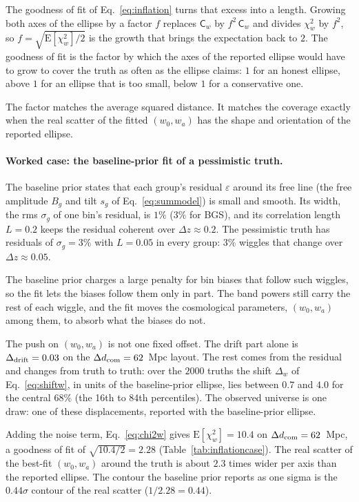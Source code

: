 \documentclass[11pt]{article}
\newcommand{\Cov}{\mathsf{C}}
\begin{document}
The goodness of fit of Eq.~\eqref{eq:inflation} turns that excess
into a length.  Growing both axes of the ellipse by a factor $f$
replaces $\Cov_w$ by $f^2\,\Cov_w$ and divides $\chi^2_w$ by $f^2$, so
$f = \sqrt{\mathrm{E}[\chi^2_w]/2}$ is the growth that brings the
expectation back to $2$.  The goodness of fit is the factor by which
the axes of the reported ellipse would have to grow to cover the truth as
often as the ellipse claims: $1$ for an honest ellipse, above $1$ for
an ellipse that is too small, below $1$ for a conservative one.

The factor matches the average squared distance.  It matches the
coverage exactly when the real scatter of the fitted $(w_0, w_a)$ has
the shape and orientation of the reported ellipse.

\paragraph{Worked case: the baseline-prior fit of a pessimistic truth.}
The baseline prior states that each group's residual $\varepsilon$
around its free line (the free amplitude $B_g$ and tilt $s_g$ of
Eq.~\eqref{eq:summodel}) is small and smooth.  Its width, the rms
$\sigma_g$ of one bin's residual, is $1\%$ ($3\%$ for BGS), and its
correlation length $L = 0.2$ keeps the residual coherent over
$\Delta z \approx 0.2$.  The pessimistic truth has residuals of
$\sigma_g = 3\%$ with $L = 0.05$ in every group: $3\%$ wiggles that
change over $\Delta z \approx 0.05$.

The baseline prior charges a large penalty for bin biases that follow
such wiggles, so the fit lets the biases follow them only in part.
The band powers still carry the rest of each wiggle, and the fit
moves the cosmological parameters, $(w_0, w_a)$ among them, to absorb
what the biases do not.

The push on $(w_0, w_a)$ is not one fixed offset.  The drift part
alone is $\Delta_{\rm drift} = 0.03$ on the
$\Delta d_{\rm com} = 62$~Mpc layout.  The rest comes from the
residual and changes from truth to truth: over the $2000$ truths the
shift $\Delta_w$ of Eq.~\eqref{eq:shiftw}, in units of the
baseline-prior ellipse, lies between $0.7$ and $4.0$ for the central $68\%$ (the
16th to 84th percentiles).  The observed universe is one draw: one of
these displacements, reported with the baseline-prior ellipse.

Adding the noise term, Eq.~\eqref{eq:chi2w} gives
$\mathrm{E}[\chi^2_w] = 10.4$ on $\Delta d_{\rm com} = 62$~Mpc, a
goodness of fit of $\sqrt{10.4/2} = 2.28$ (Table~\ref{tab:inflationcase}).
The real scatter of the best-fit $(w_0, w_a)$ around the truth is
about $2.3$ times wider per axis than the reported ellipse.  The
contour the baseline prior reports as one sigma is the $0.44\sigma$ contour
of the real scatter ($1/2.28 = 0.44$).
\end{document}
